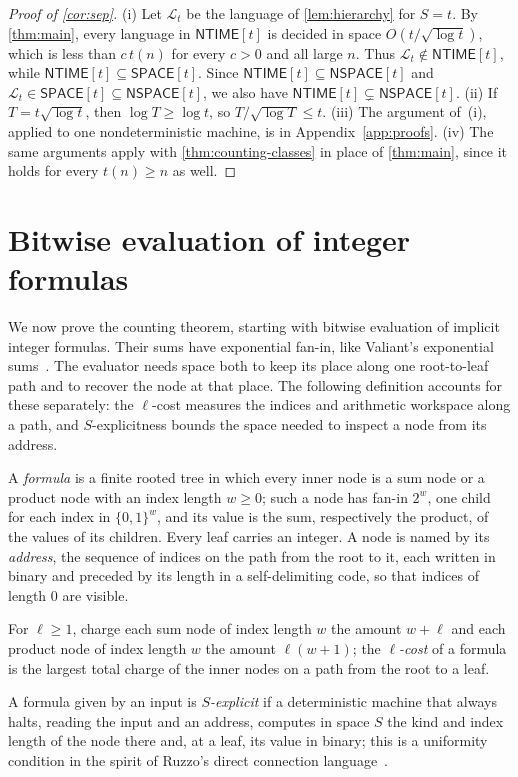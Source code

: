 \documentclass[11pt]{article}
\theoremstyle{definition}
\theoremstyle{definition}
\theoremstyle{remark}
\newcommand{\NTIME}{\mathsf{NTIME}}
\newcommand{\SPACE}{\mathsf{SPACE}}
\newcommand{\NSPACE}{\mathsf{NSPACE}}
\begin{document}
\begin{proof}[Proof of \cref{cor:sep}]
(i) Let $\mathcal L_t$ be the language of \cref{lem:hierarchy} for $S=t$. By \cref{thm:main}, every language in $\NTIME[t]$ is decided in space $O(t/\sqrt{\log t})$, which is less than $c\,t(n)$ for every $c>0$ and all large $n$. Thus $\mathcal L_t\notin\NTIME[t]$, while $\NTIME[t]\subseteq\SPACE[t]$. Since $\NTIME[t]\subseteq\NSPACE[t]$ and $\mathcal L_t\in\SPACE[t]\subseteq\NSPACE[t]$, we also have $\NTIME[t]\subsetneq\NSPACE[t]$. (ii) If $T=t\sqrt{\log t}$, then $\log T\ge\log t$, so $T/\sqrt{\log T}\le t$. (iii) The argument of~(i), applied to one nondeterministic machine, is in Appendix~\ref{app:proofs}. (iv) The same arguments apply with \cref{thm:counting-classes} in place of \cref{thm:main}, since it holds for every $t(n)\ge n$ as well.
\end{proof}

\section{Bitwise evaluation of integer formulas}\label{sec:formulas}

We now prove the counting theorem, starting with bitwise evaluation of implicit integer formulas. Their sums have exponential fan-in, like Valiant's exponential sums~\cite{Val79}. The evaluator needs space both to keep its place along one root-to-leaf path and to recover the node at that place. The following definition accounts for these separately: the $\ell$-cost measures the indices and arithmetic workspace along a path, and $S$-explicitness bounds the space needed to inspect a node from its address.

\begin{definition}\label{def:formula}
A \emph{formula} is a finite rooted tree in which every inner node is a sum node or a product node with an index length $w\ge0$; such a node has fan-in $2^w$, one child for each index in $\{0,1\}^w$, and its value is the sum, respectively the product, of the values of its children. Every leaf carries an integer. A node is named by its \emph{address}, the sequence of indices on the path from the root to it, each written in binary and preceded by its length in a self-delimiting code, so that indices of length $0$ are visible.

For $\ell\ge1$, charge each sum node of index length $w$ the amount $w+\ell$ and each product node of index length $w$ the amount $\ell(w+1)$; the \emph{$\ell$-cost} of a formula is the largest total charge of the inner nodes on a path from the root to a leaf.

A formula given by an input is \emph{$S$-explicit} if a deterministic machine that always halts, reading the input and an address, computes in space $S$ the kind and index length of the node there and, at a leaf, its value in binary; this is a uniformity condition in the spirit of Ruzzo's direct connection language~\cite{Ruz81}.
\end{definition}
\end{document}
